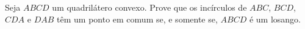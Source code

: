 Seja $ABCD$ um quadrilátero convexo. Prove que os incírculos de $ABC$, $BCD$, $CDA$ e $DAB$ têm um ponto em comum se, e somente se, $ABCD$ é um losango.